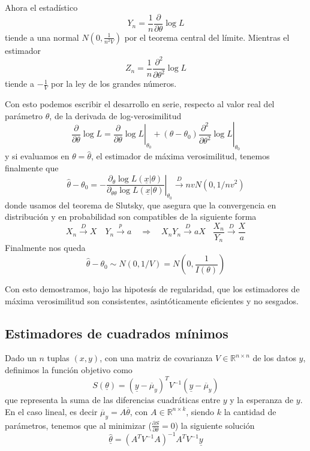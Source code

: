 \documentclass{article}
\numberwithin{equation}{section} %
\begin{document}
Ahora el estadístico
\[ Y_n = \frac{1}{n} \frac{\partial}{\partial \theta} \log L \]
tiende a una normal $N(0, \frac{1}{n^2 V})$ por el teorema central del límite. Mientras el estimador
\[Z_n = \frac{1}{n} \frac{\partial^2}{\partial \theta^2} \log L\]
tiende a $-\frac{1}{V}$ por la ley de los grandes números. 

Con esto podemos escribir el desarrollo en serie, respecto al valor real del parámetro $\theta$, de la derivada de log-verosimilitud
\[\frac{\partial}{\partial \theta} \log L = \left.\frac{\partial}{\partial \theta}\log L\right|_{\theta_0} + (\theta - \theta_0) \left.\frac{\partial^2}{\partial \theta^2} \log L\right|_{\theta_0}\]
y si evaluamos en $\theta = \hat{\theta}$, el estimador de máxima verosimilitud, tenemos finalmente que
\[\hat{\theta} - \theta_0 = - \left.\frac{\partial_{\theta} \log L(\underline{x}|\theta)}{\partial_{\theta \theta} \log L(\underline{x}|\theta)}\right|_{\theta_0} \xrightarrow{D} n v N(0, 1/nv^2)\]
donde usamos del teorema de Slutsky, que asegura que la convergencia en distribución y en probabilidad son compatibles de la siguiente forma
\begin{equation}
X_n \xrightarrow{D} X \quad Y_n \xrightarrow{p} a \quad \Rightarrow \quad X_n Y_n \xrightarrow{D} a X \; \; \; \frac{X_n}{Y_n} \xrightarrow{D} \frac{X}{a}
\end{equation}
Finalmente nos queda
\begin{equation}
\hat{\theta} - \theta_0 \sim N(0, 1/V) = N\left(0, \frac{1}{I(\theta)}\right)
\end{equation}

Con esto demostramos, bajo las hipotesís de regularidad, que los estimadores de máxima verosimilitud son consistentes, asintóticamente eficientes y no sesgados.


\subsection{Estimadores de cuadrados mínimos}
Dado un $n$ tuplas $(x,y)$, con una matriz de covarianza $V \in \mathbb{R}^{n\times n}$ de los datos $y$, definimos la función objetivo como
\begin{equation}
S(\underline{\theta}) = (\underline{y} - \overline{\mu}_y)^{T} V^{-1} (\underline{y} - \overline{\mu}_y)
\end{equation}
que representa la suma de las diferencias cuadráticas entre $y$ y la esperanza de $y$. En el caso lineal, es decir $\overline{\mu}_y = A \overline{\theta}$, con $A \in \mathbb{R}^{n \times k}$, siendo $k$ la cantidad de parámetros, tenemos que al minimizar ($\frac{\partial S}{\partial \theta} = 0$) la siguiente solución
\begin{equation}
\hat{\underline{\theta}} = (A^T V^{-1} A)^{-1} A^{T} V^{-1} \underline{y}
\end{equation}
\end{document}
